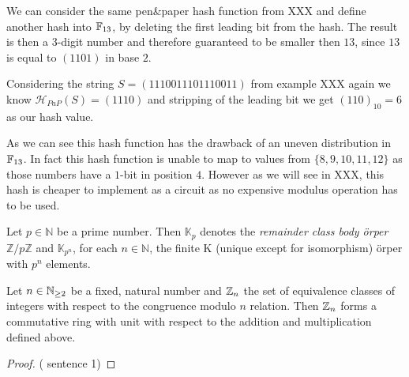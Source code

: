 \begin{example}We can consider the same pen\&paper hash function from XXX and define another hash into $\mathbb{F}_{13}$, by deleting the first leading bit from the hash. The result is then a $3$-digit number and therefore guaranteed to be smaller then $13$, since $13$ is equal to $(1101)$ in base $2$.  

Considering the string $S=(1110011101110011)$ from example XXX again we know $\mathcal{H}_{PaP}(S)=(1110)$ and stripping of the leading bit we get $(110)_{10}=6$ as our hash value.  

As we can see this hash function has the drawback of an uneven distribution in $\mathbb{F}_{13}$. In fact this hash function is unable to map to values from $\{8,9,10,11,12\}$ as those numbers have a $1$-bit in position $4$. However as we will see in XXX, this hash is cheaper to implement as a circuit as no expensive modulus operation has to be used.
\end{example}

\begin{definition} Let $ p \in \mathbb{N} $ be a prime number. Then $ \mathbb{K} _p $ denotes the \textit{remainder class body \"orper} $ \mathbb{ Z} / p \mathbb{Z} $ and $ \mathbb{K} _{p ^ n} $, for each $ n \in \mathbb{N} $, the finite K (unique except for isomorphism) \"orper with $ p ^ n $ elements.
\end{definition} 

\begin{theorem}
\label{def: residual class ring}
Let $ n \in \mathbb{N} _{\geq 2} $ be a fixed, natural number and
$ \mathbb{Z}_n $ the set of equivalence classes of integers with respect to the  congruence modulo $ n $ relation. Then $ \mathbb{Z}_n $ forms a commutative ring with unit with respect to the addition and multiplication defined above.
\end{theorem}
\begin{proof} (\cite{AL} sentence 1)  
\end{proof}

